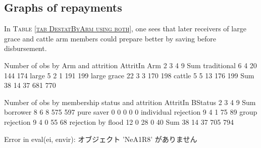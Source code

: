 

\subsection{Graphs of repayments}

In \textsc{\normalsize Table \ref{tab DestatByArm using both}}, one sees that later receivers of \textsf{large grace} and \textsf{cattle} arm members could prepare better by saving before disbursement. 
\begin{Schunk}
\begin{Soutput}


Number of obs by Arm and attrition
             AttritIn
Arm             2   3   4   9 Sum
  traditional   6   4  20 144 174
  large         5   2   1 191 199
  large grace  22   3   3 170 198
  cattle        5   5  13 176 199
  Sum          38  14  37 681 770


Number of obs by membership status and attrition
                      AttritIn
BStatus                  2   3   4   9 Sum
  borrower               8   6   8 575 597
  pure saver             0   0   0   0   0
  individual rejection   9   4   1  75  89
  group rejection        9   4   0  55  68
  rejection by flood    12   0  28   0  40
  Sum                   38  14  37 705 794
\end{Soutput}
\begin{Soutput}
Error in eval(ei, envir):  オブジェクト 'NeA1R8' がありません 
\end{Soutput}
\end{Schunk}

